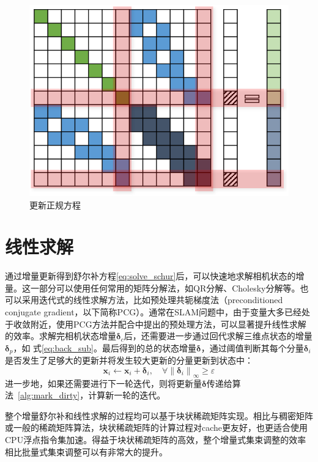 \begin{figure}[htb!]
    \centering
    \includegraphics[scale=1]{Pictures/normal_eq_update.png}
    \caption{更新正规方程}
    \label{fig:normal_eq_update}
\end{figure}



\section{线性求解}

通过增量更新得到舒尔补方程\eqref{eq:solve_schur}后，可以快速地求解相机状态的增量。这一部分可以使用任何常用的矩阵分解法，如QR分解、Cholesky分解等。也可以采用迭代式的线性求解方法，比如预处理共轭梯度法（preconditioned conjugate gradient，以下简称PCG）。通常在SLAM问题中，由于变量大多已经处于收敛附近，使用PCG方法并配合\citep{jeong2012pushing}中提出的预处理方法，可以显著提升线性求解的效率。求解完相机状态增量$\bm{\delta}_c$后，还需要进一步通过回代求解三维点状态的增量$\bm{\delta}_p$，如 式\eqref{eq:back_sub}。最后得到的总的状态增量$\bm{\delta}$，通过阈值判断其每个分量$\bm{\delta}_i$是否发生了足够大的更新并将发生较大更新的分量更新到状态中：
\begin{equation}
    \bm{x}_i \leftarrow \bm{x}_i + \bm{\delta}_i, \quad
    \forall \left\|\bm{\delta}_i\right\|_{\infty} \geq \varepsilon
\end{equation}
进一步地，如果还需要进行下一轮迭代，则将更新量$\bm{\delta}$传递给算法~\ref{alg:mark_dirty}，计算新一轮的迭代。

整个增量舒尔补和线性求解的过程均可以基于块状稀疏矩阵实现。相比与稠密矩阵或一般的稀疏矩阵算法，块状稀疏矩阵的计算过程对cache更友好，也更适合使用CPU浮点指令集加速。得益于块状稀疏矩阵的高效，整个增量式集束调整的效率相比批量式集束调整可以有非常大的提升。

